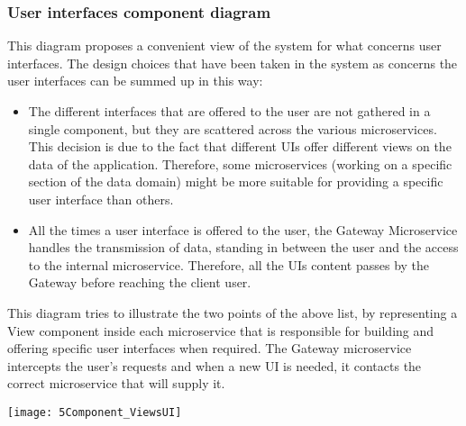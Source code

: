 \subsubsection{User interfaces component diagram}
\begin{minipage}{\linewidth}
	This diagram proposes a convenient view of the system for what concerns user interfaces. The design choices that have been taken in the \app system as concerns the user interfaces can be summed up in this way:
	
	\begin{itemize}
		\item The different interfaces that are offered to the user are not gathered in a single component, but they are scattered across the various microservices. This decision is due to the fact that different UIs offer different views on the data of the application. Therefore, some microservices (working on a specific section of the data domain) might be more suitable for providing a specific user interface than others.
		\item All the times a user interface is offered to the user, the Gateway Microservice handles the transmission of data, standing in between the user and the access to the internal microservice. Therefore, all the UIs content passes by the Gateway before reaching the client user.
	\end{itemize}
	
	This diagram tries to illustrate the two points of the above list, by representing a View component inside each microservice that is responsible for building and offering specific user interfaces when required. 
	The Gateway microservice intercepts the user's requests and when a new UI is needed, it contacts the correct microservice that will supply it.
	
	
	\texttt{[image: 5Component\_ViewsUI]}
	
	
	
\end{minipage}